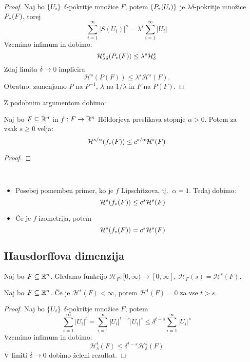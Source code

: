 \begin{proof}
    Naj bo \(\left\{U_i\right\}\) \(\delta\)-pokritje množice \(F\), potem \(\left\{P_{*}(U_i)\right\}\) je \(\lambda \delta\)-pokritje množice \(P_{*}(F)\), torej 
    \[\sum_{i=1}^{\infty} |S(U_i)|^s = \lambda^s \sum_{i=1}^{\infty}|U_i|\]
    Vzemimo infimum in dobimo:
    \[\mathcal{H}^s_{\lambda \delta} (P_{*}(F)) \leq \lambda^s \mathcal{H}^s_{\delta}\]
    Zdaj limita \(\delta \to 0\) implicira 
    \[\mathcal{H}^s(P(F)) \leq \lambda^s \mathcal{H}^s(F).\]
    Obratno: zamenjamo \(P\) na \(P^{-1}\), \(\lambda\) na \(1/\lambda\) in \(F\) na \(P(F)\).
\end{proof}

Z podobnim argumentom dobimo:
\begin{trditev}
    Naj bo \(F \subseteq \mathbb{R}^n\) in \(f: F \to \mathbb{R}^n\) Höldorjeva preslikava stopnje \(\alpha > 0\). Potem za vsak \(s \geq 0\) velja:
    \[\mathcal{H}^{s/\alpha}(f_{*}(F)) \leq c^{s/\alpha} \mathcal{H}^s(F)\]
\end{trditev}

\begin{proof}
    \todo{}
\end{proof}

\begin{opomba} \
    \begin{itemize}
        \item Posebej pomemben primer, ko je \(f\) Lipschitzova, tj.\ \(\alpha = 1\). Tedaj dobimo:
        \[\mathcal{H}^{s}(f_{*}(F)) \leq c^{s} \mathcal{H}^s(F)\]
        \item Če je \(f\) izometrija, potem 
        \[\mathcal{H}^{s}(f_{*}(F)) = c^{s} \mathcal{H}^s(F)\]
    \end{itemize}
\end{opomba}

\subsection{Hausdorffova dimenzija}
Naj bo \(F \subseteq \mathbb{R}^n\). Gledamo funkcijo \(\mathcal{H}_F: [0, \infty) \to [0, \infty], \ \mathcal{H}_F(s) = \mathcal{H}^{s}(F)\).

\begin{lema}
    Naj bo \(F \subseteq \mathbb{R}^n\). Če je \(\mathcal{H}^{s}(F) < \infty\), potem \(\mathcal{H}^{t}(F) = 0\) za vse \(t > s\).
\end{lema}

\begin{proof}
    Naj bo \(\left\{U_i\right\}\) \(\delta\)-pokritje množice \(F\), potem 
    \[\sum_{i=1}^{\infty} |U_i|^t = \sum_{i=1}^{\infty}|U_i|^{t-s}|U_i|^s \leq \delta^{t-s} \sum_{i=1}^{\infty}|U_i|^s\]
    Vzemimo infimum in dobimo:
    \[\mathcal{H}^{t}_\delta(F) \leq \delta^{t-s}\mathcal{H}^{s}_\delta(F)\]
    V limiti \(\delta \to 0\) dobimo želeni rezultat.
\end{proof}

